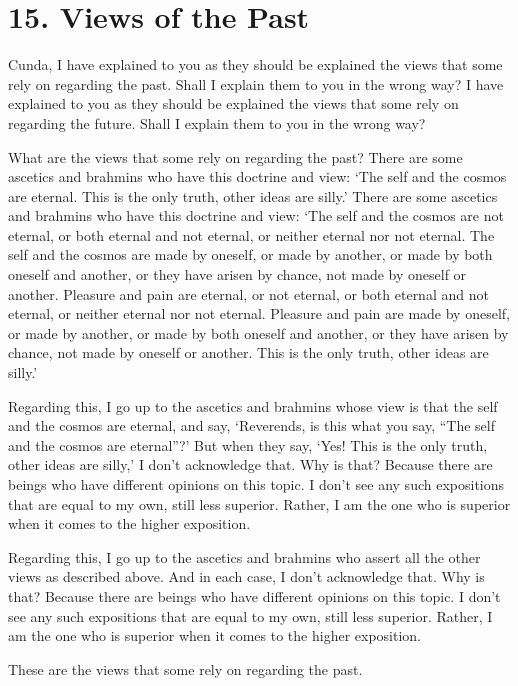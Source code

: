 \documentclass[12pt,openany]{book}%
\begin{document}
\section*{15. Views of the Past }

Cunda, I have explained to you as they should be explained the views that some rely on regarding the past. Shall I explain them to you in the wrong way? I have explained to you as they should be explained the views that some rely on regarding the future. Shall I explain them to you in the wrong way? 

What are the views that some rely on regarding the past? There are some ascetics and brahmins who have this doctrine and view: ‘The self and the cosmos are eternal. This is the only truth, other ideas are silly.’ There are some ascetics and brahmins who have this doctrine and view: ‘The self and the cosmos are not eternal, or both eternal and not eternal, or neither eternal nor not eternal. The self and the cosmos are made by oneself, or made by another, or made by both oneself and another, or they have arisen by chance, not made by oneself or another. Pleasure and pain are eternal, or not eternal, or both eternal and not eternal, or neither eternal nor not eternal. Pleasure and pain are made by oneself, or made by another, or made by both oneself and another, or they have arisen by chance, not made by oneself or another. This is the only truth, other ideas are silly.’ 

Regarding this, I go up to the ascetics and brahmins whose view is that the self and the cosmos are eternal, and say, ‘Reverends, is this what you say, “The self and the cosmos are eternal”?’ But when they say, ‘Yes! This is the only truth, other ideas are silly,’ I don’t acknowledge that. Why is that? Because there are beings who have different opinions on this topic. I don’t see any such expositions that are equal to my own, still less superior. Rather, I am the one who is superior when it comes to the higher exposition. 

Regarding this, I go up to the ascetics and brahmins who assert all the other views as described above. And in each case, I don’t acknowledge that. Why is that? Because there are beings who have different opinions on this topic. I don’t see any such expositions that are equal to my own, still less superior. Rather, I am the one who is superior when it comes to the higher exposition. 

These are the views that some rely on regarding the past. 
\end{document}
